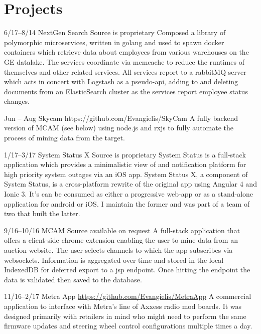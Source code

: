 \documentclass[]{friggeri-cv}
\begin{document}


\section{Projects}

\begin{entrylist}


\entry
{6/17--8/14}
{NextGen Search}
{Source is proprietary}
{Composed a library of polymorphic microservices, written in golang and used to spawn docker containers which retrieve data about employees from various warehouses on the GE datalake.  The services coordinate via memcache to reduce the runtimes of themselves and other related services.  All services report to a rabbitMQ server which acts in concert with Logstash as a pseudo-api, adding to and deleting documents from an ElasticSearch cluster as the services report employee status changes.}

\entry
{Jun -- Aug}
{Skycam}
{https://github.com/Evangielis/SkyCam}
{A fully backend version of MCAM (see below) using node.js and rxjs to fully automate the process of mining data from the target.}

\entry
{1/17--3/17}
{System Status X}
{Source is proprietary}
{System Status is a full-stack application which provides a minimalistic view of and notification platform for high priority system outages via an iOS app.  System Status X, a component of System Status, is a cross-platform rewrite of the original app using Angular 4 and Ionic 3.  It's can be consumed as either a progressive web-app or as a stand-alone application for android or iOS.  I maintain the former and was part of a team of two that built the latter.}

\entry
{9/16--10/16}
{MCAM}
{Source available on request}
{A full-stack application that offers a client-side chrome extension enabling the user to mine data from an auction website. The user selects channels to which the app subscribes via websockets. Information is aggregated over time and stored in the local IndexedDB for deferred export to a jsp endpoint.  Once hitting the endpoint the data is validated then saved to the database.}

\entry
{11/16--2/17}
{Metra App}
{\href{https://github.com/Evangielis/MetraApp}{https://github.com/Evangielis/MetraApp}}
{A commercial application to interface with Metra's line of Axxess radio mod boards.  It was designed primarily with retailers in mind who might need to perform the same firmware updates and steering wheel control configurations multiple times a day.}


\end{entrylist}
\end{document}
